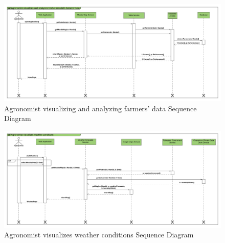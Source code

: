 \newpage
\begin{landscape}
\begin{figure}[h]
\vspace*{-2cm}
\noindent
\centering
\centerline{\includegraphics[scale= 0.108]{./Images/Agronomist visualizes and analyzes his_her mandal's farmers' data.png}}
    \caption{Agronomist visualizing and analyzing farmers' data Sequence Diagram}
    \vspace*{-12cm}
\end{figure}
\fillandplacepagenumber
\end{landscape}

\newpage
\begin{landscape}
\begin{figure}[h]
\vspace*{-2cm}
\noindent
\centering
\centerline{\includegraphics[scale= 0.108]{./Images/Agronomist visualizes weather conditions.png}}
    \caption{Agronomist visualizes weather conditions Sequence Diagram}
    \vspace*{-12cm}
\end{figure}
\fillandplacepagenumber
\end{landscape}
